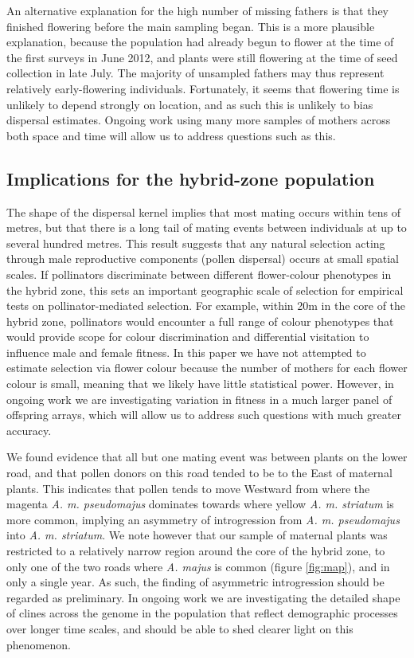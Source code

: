 \documentclass[10pt, a4paper, twocolumn]{article} %
\begin{document}
An alternative explanation for the high number of missing fathers is that they finished flowering before the main sampling began.
This is a more plausible explanation, because the population had already begun to flower at the time of the first surveys in June 2012, and plants were still flowering at the time of seed collection in late 
July.
The majority of unsampled fathers may thus represent relatively early-flowering individuals.
Fortunately, it seems that flowering time is unlikely to depend strongly on location, and as such this is unlikely to bias dispersal estimates.
Ongoing work using many more samples of mothers across both space and time will allow us to address questions such as this.

\subsection{Implications for the hybrid-zone population}

The shape of the dispersal kernel implies that most mating occurs within tens of metres, but that there is a long tail of mating events between individuals at up to several hundred metres. This result suggests that any natural selection acting through male reproductive components (pollen dispersal) occurs at small spatial scales. If pollinators discriminate between different flower-colour phenotypes in the hybrid zone, this sets an important geographic scale of selection for empirical tests on pollinator-mediated selection. For example, within 20m in the core of the hybrid zone, pollinators would encounter a full range of colour phenotypes that would provide scope for colour discrimination and differential visitation to influence male and female fitness. In this paper we have not attempted to estimate selection via flower colour because the number of mothers for each flower colour is small, meaning that we likely have little statistical power. However, in ongoing work we are investigating variation in fitness in a much larger panel of offspring arrays, which will allow us to address such questions with much greater accuracy.

We found evidence that all but one mating event was between plants on the lower road, and that pollen donors on this road tended to be to the East of maternal plants.
This indicates that pollen tends to move Westward from where the magenta \textit{A. m. pseudomajus} dominates towards where yellow \textit{A. m. striatum} is more common, implying an asymmetry of introgression from \textit{A. m. pseudomajus} into \textit{A. m. striatum}.
We note however that our sample of maternal plants was restricted to a relatively narrow region around the core of the hybrid zone, to only one of the two roads where \textit{A. majus} is common (figure \ref{fig:map}), and in only a single year.
As such, the finding of asymmetric introgression should be regarded as preliminary.
In ongoing work we are investigating the detailed shape of clines across the genome in the population that reflect demographic processes over longer time scales, and should be able to shed clearer light on this phenomenon.
\end{document}
